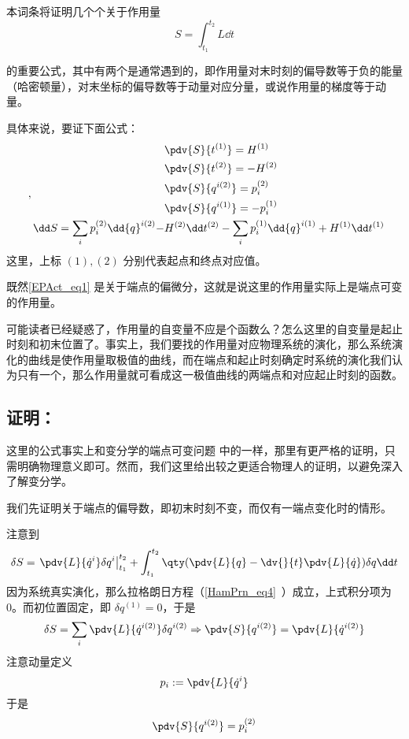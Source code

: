 
本词条将证明几个个关于作用量
\begin{equation}
S=\int_{t_1}^{t_2}L\dd t
\end{equation}

的重要公式，其中有两个是通常遇到的，即作用量对末时刻的偏导数等于负的能量（哈密顿量），对末坐标的偏导数等于动量对应分量，或说作用量的梯度等于动量。

具体来说，要证下面公式：
\begin{equation}\label{EPAct_eq1}~,
\begin{aligned}
&\pdv{S}{t^{(1)}}=H^{(1)}\\
&\pdv{S}{t^{(2)}}=-H^{(2)}\\
&\pdv{S}{{q}^{i(2)}}=p_i^{(2)}\\
&\pdv{S}{{q}^{i (1)}}=-p_i^{(1)}\\
\dd S=\sum_i p_i^{(2)}\dd {q}^{i (2)}-&H^{(2)}\dd t^{(2)}-\sum_i p_i^{(1)}\dd {q}^{i (1)}+H^{(1)}\dd t^{(1)}
\end{aligned}
\end{equation}
这里，上标 $(1),(2)$ 分别代表起点和终点对应值。

既然\autoref{EPAct_eq1} 是关于端点的偏微分，这就是说这里的作用量实际上是端点可变的作用量。

可能读者已经疑惑了，作用量的自变量不应是个函数么？怎么这里的自变量是起止时刻和初末位置了。事实上，我们要找的作用量对应物理系统的演化，那么系统演化的曲线是使作用量取极值的曲线，而在端点和起止时刻确定时系统的演化我们认为只有一个，那么作用量就可看成这一极值曲线的两端点和对应起止时刻的函数。
\subsection{证明：}
这里的公式事实上和变分学的端点可变问题 中的一样，那里有更严格的证明，只需明确物理意义即可。然而，我们这里给出较之更适合物理人的证明，以避免深入了解变分学。

我们先证明关于端点的偏导数，即初末时刻不变，而仅有一端点变化时的情形。

注意到
\begin{equation}
\delta S=\left.\pdv{L}{\dot q^i}\delta q^i\right|_{t_1}^{t_2}+\int_{t_1}^{t_2}\qty(\pdv{L}{q}-\dv{}{t}\pdv{L}{\dot q})\delta q\dd t
\end{equation}
因为系统真实演化，那么拉格朗日方程（\autoref{HamPrn_eq4}~）成立，上式积分项为0。而初位置固定，即 $\delta q^{(1)}=0$，于是
\begin{equation}
\delta S=\sum_i\pdv{L}{{\dot q}^{i (2)}}\delta {q}^{i (2)}\Rightarrow \pdv{S}{{q}^{i (2)}}=\pdv{L}{{\dot q}^{i (2)}}
\end{equation}
注意动量定义
\begin{equation}
p_i:=\pdv{L}{\dot q^i}
\end{equation}
于是
\begin{equation}
\pdv{S}{{q}^{i (2)}}=p_i^{(2)}
\end{equation}

